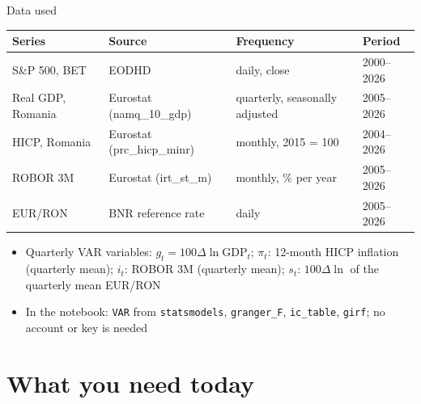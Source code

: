 \begin{frame}{Data used}
\itemsize{\small}
\begin{center}
\footnotesize
\begin{tabular}{llll}
\toprule
\textbf{Series} & \textbf{Source} & \textbf{Frequency} & \textbf{Period} \\
\midrule
S\&P 500, BET & EODHD & daily, close & 2000--2026 \\
Real GDP, Romania & Eurostat (namq\_10\_gdp) & quarterly, seasonally adjusted & 2005--2026 \\
HICP, Romania & Eurostat (prc\_hicp\_minr) & monthly, 2015 = 100 & 2004--2026 \\
ROBOR 3M & Eurostat (irt\_st\_m) & monthly, \% per year & 2005--2026 \\
EUR/RON & BNR reference rate & daily & 2005--2026 \\
\bottomrule
\end{tabular}
\end{center}
\begin{itemize}
    \item Quarterly VAR variables: $g_t = 100\Delta\ln\mathrm{GDP}_t$; $\pi_t$: 12-month HICP inflation (quarterly mean); $i_t$: ROBOR 3M (quarterly mean); $s_t$: $100\Delta\ln$ of the quarterly mean EUR/RON
    \item In the notebook: \texttt{VAR} from \texttt{statsmodels}, \texttt{granger\_F}, \texttt{ic\_table}, \texttt{girf}; no account or key is needed
\end{itemize}
\end{frame}


\section{What you need today}

